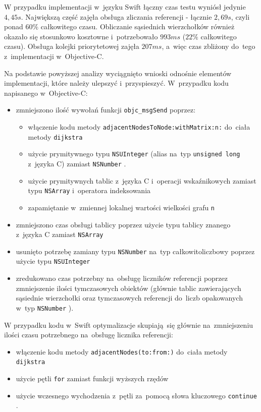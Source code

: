 \documentclass[mgr, shortabstract]{iithesis}
\newcommand{\swiftinline}[1]{
    \texttt{#1}
}
\newcommand{\objcinline}[1]{
    \texttt{#1}
}
\begin{document}
W przypadku implementacji w~języku Swift łączny czas testu wyniósł jedynie $4,45s$. Największą część zajęła obsługa zliczania referencji - łącznie $2,69s$, czyli ponad $60\%$ całkowitego czasu. Obliczanie sąsiednich wierzchołków również okazało się stosunkowo kosztowne i~potrzebowało $993ms$ ($22\%$ całkowitego czasu). Obsługa kolejki priorytetowej zajęła $207ms$, a~więc czas zbliżony do~tego z~implementacji w~Objective-C.

Na podstawie powyższej analizy wyciągnięto wnioski odnośnie elementów implementacji, które należy ulepszyć i~przyspieszyć. W~przypadku kodu napisanego w~Objective-C:

\begin{itemize}
    \item zmniejszono ilość wywołań funkcji \objcinline{objc_msgSend} poprzez:
    \begin{itemize}
        \item włączenie kodu metody \objcinline{adjacentNodesToNode:withMatrix:n:} do~ciała metody \objcinline{dijkstra}
        \item użycie prymitywnego typu \objcinline{NSUInteger} (alias na~typ \objcinline{unsigned long} z~języka C) zamiast \objcinline{NSNumber}.
        \item użycie prymitywnych tablic z~języka C i~operacji wskaźnikowych zamiast typu \objcinline{NSArray} i~operatora indeksowania
        \item zapamiętanie w~zmiennej lokalnej wartości wielkości grafu \objcinline{n}
    \end{itemize}
    \item zmniejszono czas obsługi tablicy poprzez użycie typu tablicy znanego z~języka C zamiast \objcinline{NSArray}
    \item usunięto potrzebę zamiany typu \objcinline{NSNumber} na~typ całkowitoliczbowy poprzez użycie typu \objcinline{NSUInteger}
    \item zredukowano czas potrzebny na~obsługę liczników referencji poprzez zmniejszenie ilości tymczasowych obiektów (głównie tablic zawierających sąsiednie wierzchołki oraz tymczasowych referencji do~liczb opakowanych w~typ \objcinline{NSNumber}).
\end{itemize}

W przypadku kodu w~Swift optymalizacje skupiają się głównie na~zmniejszeniu ilości czasu potrzebnego na~obsługę licznika referencji:

\begin{itemize}
    \item włączenie kodu metody \swiftinline{adjacentNodes(to:from:)} do~ciała metody \swiftinline{dijkstra}
    \item użycie pętli \swiftinline{for} zamiast funkcji wyższych rzędów
    \item użycie wczesnego wychodzenia z~pętli za~pomocą słowa kluczowego \swiftinline{continue}.
\end{itemize}
\end{document}
